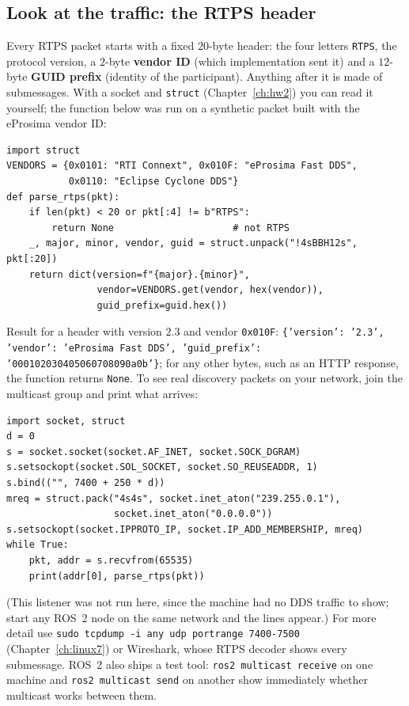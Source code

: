 \subsection*{Look at the traffic: the RTPS header}
Every RTPS packet starts with a fixed $20$-byte header: the four letters \verb!RTPS!, the protocol version, a $2$-byte \textbf{vendor ID} (which implementation sent it) and a $12$-byte \textbf{GUID prefix} (identity of the participant). Anything after it is made of submessages. With a socket and \verb!struct! (Chapter~\ref{ch:hw2}) you can read it yourself; the function below was run on a synthetic packet built with the eProsima vendor ID:
\begin{verbatim}
import struct
VENDORS = {0x0101: "RTI Connext", 0x010F: "eProsima Fast DDS",
           0x0110: "Eclipse Cyclone DDS"}
def parse_rtps(pkt):
    if len(pkt) < 20 or pkt[:4] != b"RTPS":
        return None                     # not RTPS
    _, major, minor, vendor, guid = struct.unpack("!4sBBH12s", pkt[:20])
    return dict(version=f"{major}.{minor}",
                vendor=VENDORS.get(vendor, hex(vendor)),
                guid_prefix=guid.hex())
\end{verbatim}
Result for a header with version $2.3$ and vendor \verb!0x010F!: \texttt{\{'version': '2.3', 'vendor': 'eProsima Fast DDS', 'guid\_prefix': '000102030405060708090a0b'\}}; for any other bytes, such as an HTTP response, the function returns \verb!None!. To see real discovery packets on your network, join the multicast group and print what arrives:
\begin{verbatim}
import socket, struct
d = 0
s = socket.socket(socket.AF_INET, socket.SOCK_DGRAM)
s.setsockopt(socket.SOL_SOCKET, socket.SO_REUSEADDR, 1)
s.bind(("", 7400 + 250 * d))
mreq = struct.pack("4s4s", socket.inet_aton("239.255.0.1"),
                   socket.inet_aton("0.0.0.0"))
s.setsockopt(socket.IPPROTO_IP, socket.IP_ADD_MEMBERSHIP, mreq)
while True:
    pkt, addr = s.recvfrom(65535)
    print(addr[0], parse_rtps(pkt))
\end{verbatim}
(This listener was not run here, since the machine had no DDS traffic to show; start any ROS~2 node on the same network and the lines appear.) For more detail use \verb!sudo tcpdump -i any udp portrange 7400-7500! (Chapter~\ref{ch:linux7}) or Wireshark, whose RTPS decoder shows every submessage. ROS~2 also ships a test tool: \verb!ros2 multicast receive! on one machine and \verb!ros2 multicast send! on another show immediately whether multicast works between them.

